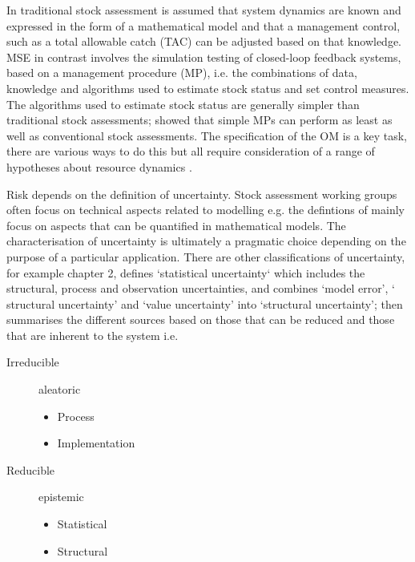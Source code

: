 \documentclass[%
nonumbib,      %
%
]{nrc1}                          %
\begin{document}
In traditional stock assessment is assumed that system dynamics are known and expressed in the form of a mathematical model and that a management control, such as a total allowable catch  (TAC) can be adjusted based on that knowledge. MSE in contrast involves the simulation testing of closed-loop feedback systems, based on a management procedure (MP), i.e. the combinations of data, knowledge and algorithms used to estimate stock status and set control measures. The algorithms used to estimate stock status are generally simpler than traditional stock assessments; \citep{geromont2014generic} showed that simple MPs can perform as least as well as conventional stock assessments. The specification of the OM is a key task, there are various ways to do this \citep{kell2006operational} but all require consideration of a range of hypotheses about resource dynamics \citep[e.g.][]{leach2014elicit}.

Risk depends on the definition of uncertainty. Stock assessment working groups often focus on technical aspects related to modelling e.g. the defintions of \cite{rosenberg1994uncertainty} mainly focus on aspects that can be quantified in mathematical models. The characterisation of uncertainty is ultimately a pragmatic choice depending on the purpose of a particular application. There are other classifications of uncertainty, for example chapter 2, defines `statistical uncertainty` which includes the structural, process and observation uncertainties, and combines ‘model error’, ‘ structural uncertainty’ and ‘value uncertainty’ into ‘structural uncertainty’; then summarises the different sources based on those that can be reduced and those that are inherent to the system i.e.

\begin{description}
\item[Irreducible] aleatoric
\begin{itemize}
 \item Process
 \item Implementation
\end{itemize}
\item[Reducible] epistemic
\begin{itemize}
 \item  Statistical
 \item  Structural
\end{itemize}
\end{description}

\end{document}
